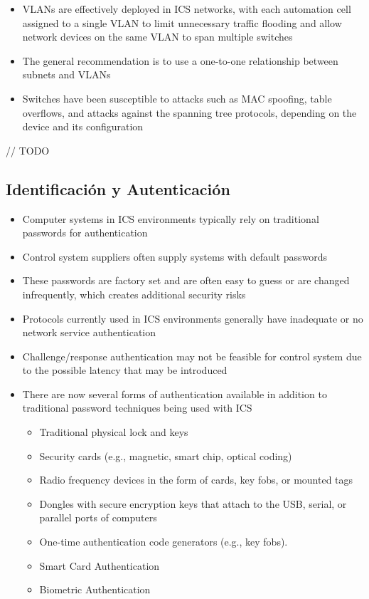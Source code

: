 \begin{itemize}
	\item VLANs are effectively deployed in ICS networks, with each
automation cell assigned to a single VLAN to limit unnecessary
traffic flooding and allow network devices on the same VLAN to
span multiple switches
	\item The general recommendation is to use a one-to-one relationship
between subnets and VLANs
	\item Switches have been susceptible to attacks such as MAC spoofing,
table overflows, and attacks against the spanning tree protocols,
depending on the device and its configuration
\end{itemize}

// TODO

\subsection{Identificación y Autenticación}
\begin{itemize}
	\item Computer systems in ICS environments typically rely on
traditional passwords for authentication
	\item Control system suppliers often supply systems with default
passwords
	\item These passwords are factory set and are often easy to guess or
are changed infrequently, which creates additional security risks
	\item Protocols currently used in ICS environments generally have
inadequate or no network service authentication
	\item Challenge/response authentication may not be feasible for
control system due to the possible latency that may be
introduced
   \item There are now several forms of authentication available in addition to
traditional password techniques being used with ICS
\begin{itemize}
	\item Traditional physical lock and keys
	\item Security cards (e.g., magnetic, smart chip, optical coding)
	\item Radio frequency devices in the form of cards, key fobs, or mounted
tags
	\item Dongles with secure encryption keys that attach to the USB, serial,
or parallel ports of computers
	\item One-time authentication code generators (e.g., key fobs).
	\item Smart Card Authentication
	\item Biometric Authentication
\end{itemize}
\end{itemize}


